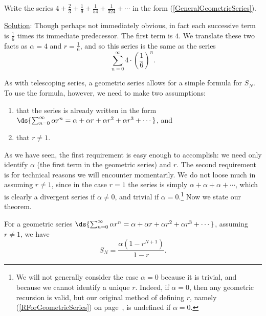 \bex Write the series $4+\frac23+\frac19+\frac1{54}+\frac1{324}+\cdots$
in the form (\ref{GeneralGeometricSeries}).

\underline{Solution}: Though perhaps not immediately obvious,
in fact each successive term is $\frac16$ times its immediate
predecessor.  The first term is $4$.  We translate these two facts as
$\alpha=4$ and $r=\frac16$, and so
this series is the same as the series 
$$\sum_{n=0}^\infty 4\cdot\left(\frac16\right)^n.$$
\eex

As with telescoping series, a geometric series
allows for a simple formula for $S_N$.
To use the formula, however, we need to make two assumptions:
\begin{enumerate}
\item that the series is already written in the form
      $\ds{\sum_{n=0}^\infty\alpha r^n=\alpha+\alpha r+\alpha r^2+
                 \alpha r^3+\cdots}$, and
\item that $r\ne1$.
\end{enumerate}
As we have seen, the first requirement is easy enough to accomplish: we 
need only identify $\alpha$ (the first term in the geometric 
series) and $r$.  The second requirement is for technical reasons
we will encounter momentarily.  We do not loose much
in assuming $r\ne1$, since in the case $r=1$ 
the series is simply $\alpha+\alpha+\alpha+\cdots$,
which is clearly a divergent series if $\alpha\ne0$, and trivial if
$\alpha=0$.\footnote{%
We will not generally consider the case $\alpha=0$ because
it is trivial, and because we cannot identify a unique $r$.
Indeed, if $\alpha=0$, then any geometric recursion is valid,
but our original method of defining $r$, namely (\ref{RForGeometricSeries})
on page~\pageref{RForGeometricSeries}, is undefined if 
$\alpha=0$.
}
Now we state our theorem.
\begin{theorem} For a geometric series $\ds{\sum_{n=0}^\infty\alpha r^n
=\alpha+\alpha r+\alpha r^2+\alpha r^3+\cdots}$, 
assuming $r\ne1$, we have
\begin{equation}
S_N=\frac{\alpha\left(1-r^{N+1}\right)}{1-r}.\label{SnForGeometric}
\end{equation}
\end{theorem}
